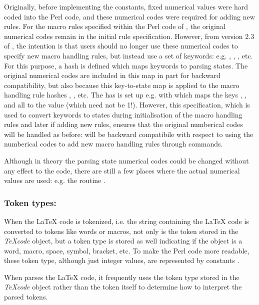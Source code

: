 \documentclass{article}
\newcommand\Obj[1]{\textsl{#1}}
\newcommand\wild{\ldots}
\begin{document}
Originally, before implementing the \code{\$STATE_\wild} constants, fixed numerical values were hard coded into the Perl code, and these numerical codes were required for adding new rules. For the macro rules specified within the Perl code of \TeXcount{}, the original numerical codes remain in the initial rule specification. However, from version 2.3 of \TeXcount{}, the intention is that users should no longer use these numerical codes to specify new macro handling rules, but instead use a set of keywords: e.g. , , , etc. For this purpose, a hash  is defined which maps keywords to parsing states. The original numerical codes are included in this map in part for backward compatibility, but also because this key-to-state map is applied to the macro handling rule hashes , , etc. The  has is set up e.g. with
which maps the keys , ,  and  all to the value  (which need not be 1!). However, this specification, which is used to convert keywords to states during initialisation of the macro handling rules and later if adding new rules, ensures that the original numberical codes will be handled as before: \TeXcount{} will be backward compatibile with respect to using the numberical codes to add new macro handling rules through  commands.

Although in theory the parsing state numerical codes could be changed without any effect to the code, there are still a few places where the actual numerical values are used: e.g. the routine .

\subsubsection{Token types: \code{\$TOKEN_\wild}}

When the \LaTeX{} code is tokenized, i.e. the string containing the \LaTeX{} code is converted to tokens like words or macros, not only is the token stored in the \Obj{TeXcode} object, but a token type is stored as well indicating if the object is a word, macro, space, symbol, bracket, etc. To make the Perl code more readable, these token type, although just integer values, are represented by constants \code{\$TOKEN_\wild}.

When  parses the \LaTeX{} code, it frequently uses the token type stored in the \Obj{TeXcode} object rather than the token itself to determine how to interpret the parsed tokens.
\end{document}
